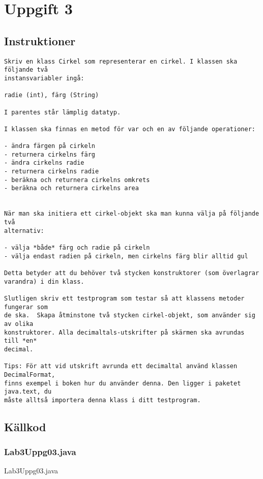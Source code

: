 \section{Uppgift 3}\label{sec:uppg03}

\subsection{Instruktioner}
\begin{Verbatim}[fontsize=\small]
Skriv en klass Cirkel som representerar en cirkel. I klassen ska följande två
instansvariabler ingå:

radie (int), färg (String)

I parentes står lämplig datatyp.

I klassen ska finnas en metod för var och en av följande operationer:

- ändra färgen på cirkeln
- returnera cirkelns färg
- ändra cirkelns radie
- returnera cirkelns radie
- beräkna och returnera cirkelns omkrets
- beräkna och returnera cirkelns area


När man ska initiera ett cirkel-objekt ska man kunna välja på följande två
alternativ:

- välja *både* färg och radie på cirkeln
- välja endast radien på cirkeln, men cirkelns färg blir alltid gul

Detta betyder att du behöver två stycken konstruktorer (som överlagrar
varandra) i din klass.

Slutligen skriv ett testprogram som testar så att klassens metoder fungerar som
de ska.  Skapa åtminstone två stycken cirkel-objekt, som använder sig av olika
konstruktorer. Alla decimaltals-utskrifter på skärmen ska avrundas till *en*
decimal.

Tips: För att vid utskrift avrunda ett decimaltal använd klassen DecimalFormat,
finns exempel i boken hur du använder denna. Den ligger i paketet java.text, du
måste alltså importera denna klass i ditt testprogram.
\end{Verbatim}


\subsection{Källkod}
\subsubsection{Lab3Uppg03.java}
\caption{Lab3Uppg03.java}
\label{src:uppg03}

